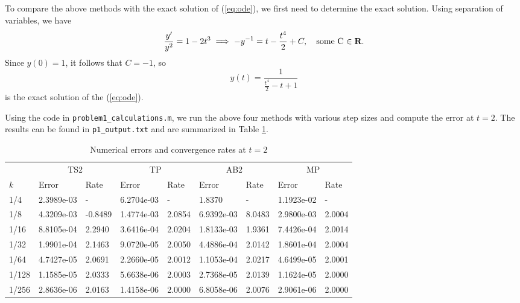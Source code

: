 \documentclass{homework}
\begin{document}
\begin{alphaparts}
		\questionpart To compare the above methods with the exact solution of (\ref{eq:ode}), we first need to determine the exact solution. Using separation of variables, we have
		\begin{equation*}
			\frac{y'}{y^2} = 1-2t^3 \implies -y^{-1} = t - \frac{t^4}{2} + C, \quad \text{some C $\in \textnormal{\bf R}$}.
		\end{equation*}
		Since $y(0)=1$, it follows that $C = -1$, so
		\begin{equation*}
			y(t) = \frac{1}{\frac{t^4}{2} - t + 1}
		\end{equation*}
		is the exact solution of the (\ref{eq:ode}).
		
		Using the code in \verb*|problem1_calculations.m|, we run the above four methods with various step sizes and compute the error at $t = 2$. The results can be found in \verb*|p1_output.txt| and are summarized in Table \ref{table:errors}.
		\begin{table}[h]
			\centering
			\begin{tabular}{@{}lllllllll@{}}
				\toprule
				& \multicolumn{2}{c}{TS2} & \multicolumn{2}{c}{TP} & \multicolumn{2}{c}{AB2} & \multicolumn{2}{c}{MP} \\
				\cmidrule(lr){2-3}
				\cmidrule(lr){4-5}
				\cmidrule(lr){6-7}
				\cmidrule(lr){8-9}
				$k$ & Error & Rate & Error & Rate & Error & Rate & Error & Rate \\
				\midrule
				1/4 & 2.3989e-03 & - & 6.2704e-03 & - & 1.8370 & - & 1.1923e-02 & - \\
				1/8 & 4.3209e-03 & -0.8489 & 1.4774e-03 & 2.0854 & 6.9392e-03 & 8.0483 & 2.9800e-03 & 2.0004 \\
				1/16 & 8.8105e-04 & 2.2940 & 3.6416e-04 & 2.0204 & 1.8133e-03 & 1.9361 & 7.4426e-04 & 2.0014 \\
				1/32 & 1.9901e-04 & 2.1463 & 9.0720e-05 & 2.0050 & 4.4886e-04 & 2.0142 & 1.8601e-04 & 2.0004 \\
				1/64 & 4.7427e-05 & 2.0691 & 2.2660e-05 & 2.0012 & 1.1053e-04 & 2.0217 & 4.6499e-05 & 2.0001 \\
				1/128 & 1.1585e-05 & 2.0333 & 5.6638e-06 & 2.0003 & 2.7368e-05 & 2.0139 & 1.1624e-05 & 2.0000 \\
				1/256 & 2.8636e-06 & 2.0163 & 1.4158e-06 & 2.0000 & 6.8058e-06 & 2.0076 & 2.9061e-06 & 2.0000 \\
				\bottomrule
			\end{tabular}
			\caption{Numerical errors and convergence rates at $t=2$}
			\label{table:errors}
		\end{table}
		

\end{alphaparts}
\end{document}
